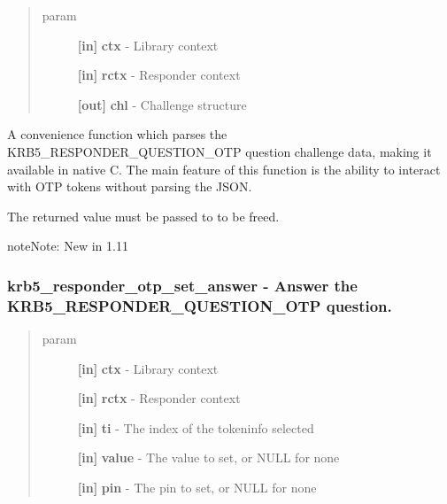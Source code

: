 \documentclass[letterpaper,10pt,english]{sphinxmanual}
\begin{document}
\begin{quote}\begin{description}
\item[{param}] \leavevmode
\textbf{{[}in{]}} \textbf{ctx} - Library context

\textbf{{[}in{]}} \textbf{rctx} - Responder context

\textbf{{[}out{]}} \textbf{chl} - Challenge structure

\end{description}\end{quote}

A convenience function which parses the KRB5\_RESPONDER\_QUESTION\_OTP question challenge data, making it available in native C. The main feature of this function is the ability to interact with OTP tokens without parsing the JSON.

The returned value must be passed to {\hyperref[appdev/refs/api/krb5_responder_otp_challenge_free:krb5_responder_otp_challenge_free]{}} to be freed.

\begin{notice}{note}{Note:}
New in 1.11
\end{notice}


\subsubsection{krb5\_responder\_otp\_set\_answer -  Answer the KRB5\_RESPONDER\_QUESTION\_OTP question.}
\label{appdev/refs/api/krb5_responder_otp_set_answer:krb5-responder-otp-set-answer-answer-the-krb5-responder-question-otp-question}\label{appdev/refs/api/krb5_responder_otp_set_answer::doc}

\begin{fulllineitems}
\label{appdev/refs/api/krb5_responder_otp_set_answer:krb5_responder_otp_set_answer}
\end{fulllineitems}

\begin{quote}\begin{description}
\item[{param}] \leavevmode
\textbf{{[}in{]}} \textbf{ctx} - Library context

\textbf{{[}in{]}} \textbf{rctx} - Responder context

\textbf{{[}in{]}} \textbf{ti} - The index of the tokeninfo selected

\textbf{{[}in{]}} \textbf{value} - The value to set, or NULL for none

\textbf{{[}in{]}} \textbf{pin} - The pin to set, or NULL for none

\end{description}\end{quote}
\end{document}

